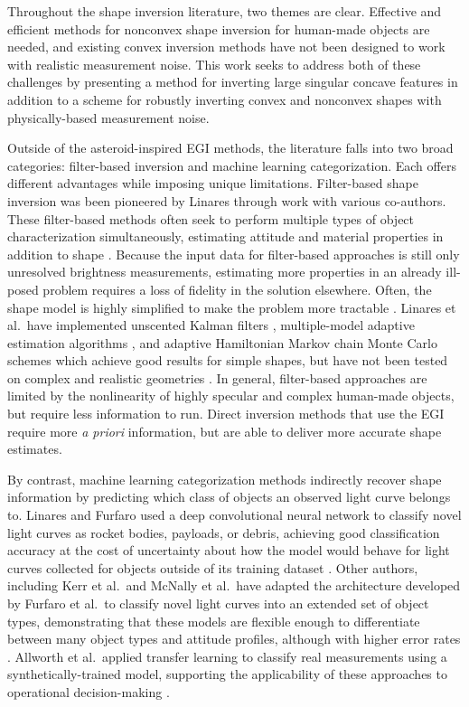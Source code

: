 Throughout the shape inversion literature, two themes are clear. Effective and efficient methods for nonconvex shape inversion for human-made objects are needed, and existing convex inversion methods have not been designed to work with realistic measurement noise. This work seeks to address both of these challenges by presenting a method for inverting large singular concave features in addition to a scheme for robustly inverting convex and nonconvex shapes with physically-based measurement noise.

Outside of the asteroid-inspired EGI methods, the literature falls into two broad categories: filter-based inversion and machine learning categorization. Each offers different advantages while imposing unique limitations. Filter-based shape inversion was been pioneered by Linares through work with various co-authors. These filter-based methods often seek to perform multiple types of object characterization simultaneously, estimating attitude and material properties in addition to shape \cite{linares2012, linares2014space, linares2018space}. Because the input data for filter-based approaches is still only unresolved brightness measurements, estimating more properties in an already ill-posed problem requires a loss of fidelity in the solution elsewhere. Often, the shape model is highly simplified to make the problem more tractable \cite{linares2012, linares2014space, linares2018space}. Linares et al.\ have implemented unscented Kalman filters \cite{linares2012}, multiple-model adaptive estimation algorithms \cite{linares2014space}, and adaptive Hamiltonian Markov chain Monte Carlo schemes \cite{linares2018space} which achieve good results for simple shapes, but have not been tested on complex and realistic geometries \cite{linares2018space}. In general, filter-based approaches are limited by the nonlinearity of highly specular and complex human-made objects, but require less information to run. Direct inversion methods that use the EGI require more \textit{a priori} information, but are able to deliver more accurate shape estimates.

By contrast, machine learning categorization methods indirectly recover shape information by predicting which class of objects an observed light curve belongs to. Linares and Furfaro used a deep convolutional neural network to classify novel light curves as rocket bodies, payloads, or debris, achieving good classification accuracy at the cost of uncertainty about how the model would behave for light curves collected for objects outside of its training dataset \cite{linares2016}. Other authors, including Kerr et al.\ and McNally et al.\ have adapted the architecture developed by Furfaro et al.\ to classify novel light curves into an extended set of object types, demonstrating that these models are flexible enough to differentiate between many object types and attitude profiles, although with higher error rates \cite{kerr2021, mcnally2021}. Allworth et al.\ applied transfer learning to classify real measurements using a synthetically-trained model, supporting the applicability of these approaches to operational decision-making \cite{allworth2021}.

